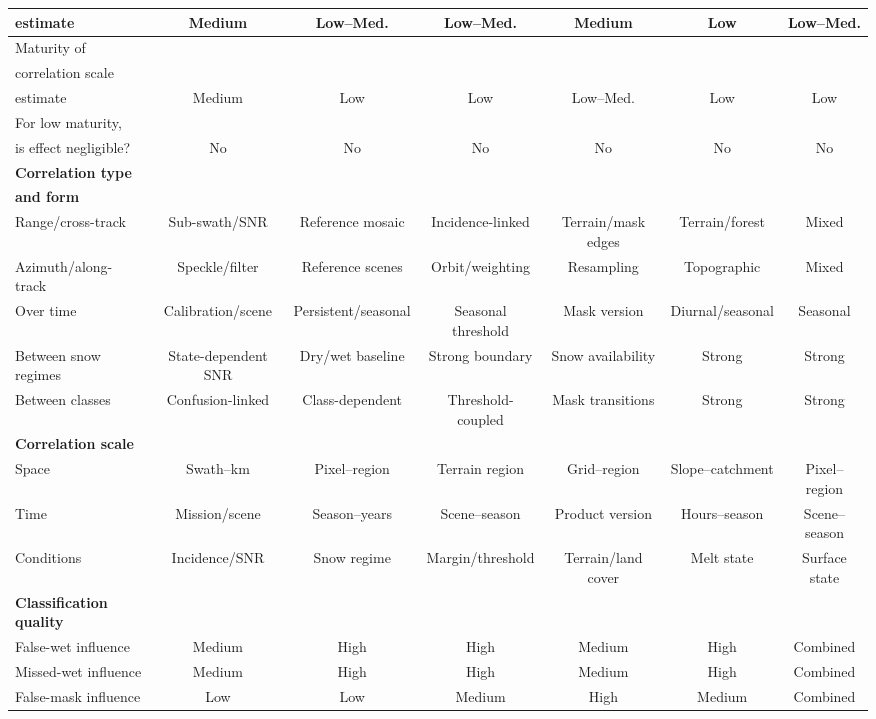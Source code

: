 \begin{table}[H]
{\begin{tabular}{|l|c|c|c|c|c|c|}
    estimate & Medium & Low--Med. & Low--Med. & Medium & Low & Low--Med. \\ \hline
    Maturity of &  & &  &  & &  \\
    correlation scale &  & &  &  & &  \\
    estimate & Medium & Low & Low & Low--Med. & Low & Low \\ \hline
    For low maturity, &  & &  &  & &  \\
    is effect negligible? & No & No & No & No & No & No \\ \hline
    \textbf{Correlation type} &  & &  &  &  &\\
    \textbf{and form} &  & &  &  &   &\\ \hline
    Range/cross-track & Sub-swath/SNR & Reference mosaic & Incidence-linked & Terrain/mask edges & Terrain/forest & Mixed \\ \hline
    Azimuth/along-track & Speckle/filter & Reference scenes & Orbit/weighting & Resampling & Topographic & Mixed \\ \hline
    Over time & Calibration/scene & Persistent/seasonal & Seasonal threshold & Mask version & Diurnal/seasonal & Seasonal \\ \hline
    Between snow regimes & State-dependent SNR & Dry/wet baseline & Strong boundary & Snow availability & Strong & Strong \\ \hline
    Between classes & Confusion-linked & Class-dependent & Threshold-coupled & Mask transitions & Strong & Strong \\ \hline
    \textbf{Correlation scale} &  & & &  &  &  \\ \hline
    Space & Swath--km & Pixel--region & Terrain region & Grid--region & Slope--catchment & Pixel--region \\ \hline
    Time & Mission/scene & Season--years & Scene--season & Product version & Hours--season & Scene--season \\ \hline
    Conditions & Incidence/SNR & Snow regime & Margin/threshold & Terrain/land cover & Melt state & Surface state \\ \hline
    \textbf{Classification quality} &  & & &  &  &  \\ \hline
    False-wet influence & Medium & High & High & Medium & High & Combined \\ \hline
    Missed-wet influence & Medium & High & High & Medium & High & Combined \\ \hline
    False-mask influence & Low & Low & Medium & High & Medium & Combined \\ \hline

\end{tabular}}
\end{table}
